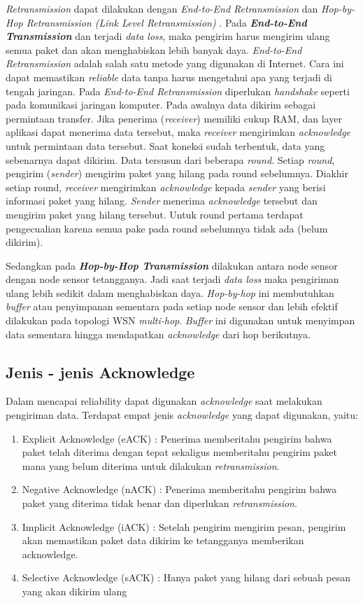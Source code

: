 \textit{Retransmission} dapat dilakukan dengan \textit{End-to-End Retransmission} dan \textit{Hop-by-Hop Retransmission (Link Level Retransmission)} \cite{DBLP:conf/secon/KimFC04}. Pada \textbf{\textit{End-to-End Transmission}} dan terjadi \textit{data loss}, maka pengirim harus mengirim ulang semua paket dan akan menghabiskan lebih banyak daya. \textit{End-to-End Retransmission} adalah salah satu metode yang digunakan di Internet. Cara ini dapat memastikan \textit{reliable} data tanpa harus mengetahui apa yang terjadi di tengah jaringan. Pada \textit{End-to-End Retransmission} diperlukan \textit{handshake} seperti pada komunikasi jaringan komputer. Pada awalnya data dikirim sebagai permintaan transfer. Jika penerima (\textit{receiver}) memiliki cukup RAM, dan layer aplikasi dapat menerima data tersebut, maka \textit{receiver} mengirimkan \textit{acknowledge} untuk permintaan data tersebut. Saat koneksi sudah terbentuk, data yang sebenarnya dapat dikirim. Data tersusun dari beberapa \textit{round}. Setiap \textit{round}, pengirim (\textit{sender}) mengirim paket yang hilang pada round sebelumnya. Diakhir setiap  round, \textit{receiver} mengirimkan \textit{acknowledge} kepada \textit{sender} yang berisi informasi paket yang hilang. \textit{Sender} menerima \textit{acknowledge} tersebut dan mengirim paket yang hilang tersebut. Untuk round pertama terdapat pengecualian karena semua pake pada round sebelumnya tidak ada (belum dikirim). 

Sedangkan pada \textbf{\textit{Hop-by-Hop Transmission}} dilakukan antara node sensor dengan node sensor tetangganya. Jadi saat terjadi \textit{data loss} maka pengiriman ulang lebih sedikit dalam menghabiskan daya. \textit{Hop-by-hop} ini membutuhkan \textit{buffer} atau penyimpanan sementara pada setiap node sensor dan lebih efektif dilakukan pada topologi WSN \textit{multi-hop}. \textit{Buffer} ini digunakan untuk menyimpan data sementara hingga mendapatkan \textit{acknowledge} dari hop berikutnya.

\subsection{Jenis - jenis Acknowledge \cite{Prakasm_2014}}
Dalam mencapai reliability dapat digunakan \textit{acknowledge} saat melakukan pengiriman data. Terdapat empat jenis \textit{acknowledge} yang dapat digunakan, yaitu:
\begin{enumerate}
	\item Explicit Acknowledge (eACK) : Penerima memberitahu pengirim bahwa paket telah diterima dengan tepat sekaligus memberitahu pengirim paket mana yang belum diterima untuk dilakukan \textit{retransmission}.
	\item Negative Acknowledge (nACK) : Penerima memberitahu pengirim bahwa paket yang diterima tidak benar dan diperlukan \textit{retransmission}.
	\item Implicit Acknowledge (iACK) : Setelah pengirim mengirim pesan, pengirim akan memastikan paket data dikirim ke tetangganya memberikan acknowledge.
	\item Selective Acknowledge (sACK) : Hanya paket yang hilang dari sebuah pesan yang akan dikirim ulang
\end{enumerate}


